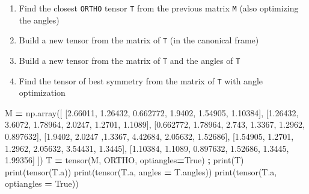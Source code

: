 \documentclass[
  a4paper,
  numbers=noendperiod,
  DIV=12]{scrreprt}
\newenvironment{Shaded}{\begin{snugshade}}{\end{snugshade}}
\newcommand{\BuiltInTok}[1]{#1}
\newcommand{\FloatTok}[1]{\textcolor[rgb]{0.00,0.00,0.81}{#1}}
\newcommand{\NormalTok}[1]{#1}
\newcommand{\OperatorTok}[1]{\textcolor[rgb]{0.81,0.36,0.00}{\textbf{#1}}}
\newcommand{\VariableTok}[1]{\textcolor[rgb]{0.00,0.00,0.00}{#1}}
\begin{document}
\begin{tcolorbox}[enhanced jigsaw, arc=.35mm, bottomrule=.15mm, bottomtitle=1mm, breakable, colback=white, colbacktitle=quarto-callout-caution-color!10!white, colframe=quarto-callout-caution-color-frame, coltitle=black, left=2mm, leftrule=.75mm, opacityback=0, opacitybacktitle=0.6, rightrule=.15mm, title={Exercise}, titlerule=0mm, toprule=.15mm, toptitle=1mm]

\begin{enumerate}
\def\labelenumi{\arabic{enumi}.}
\item
  Find the closest \texttt{ORTHO} tensor \texttt{T} from the previous
  matrix \texttt{M} (also optimizing the angles)
\item
  Build a new tensor from the matrix of \texttt{T} (in the canonical
  frame)
\item
  Build a new tensor from the matrix of \texttt{T} and the angles of
  \texttt{T}
\item
  Find the tensor of best symmetry from the matrix of \texttt{T} with
  angle optimization
\end{enumerate}

\begin{Shaded}
\begin{Highlighting}[]
\NormalTok{M }\OperatorTok{=}\NormalTok{ np.array([ [}\FloatTok{2.66011}\NormalTok{, }\FloatTok{1.26432}\NormalTok{, }\FloatTok{0.662772}\NormalTok{, }\FloatTok{1.9402}\NormalTok{, }\FloatTok{1.54905}\NormalTok{, }\FloatTok{1.10384}\NormalTok{],}
\NormalTok{               [}\FloatTok{1.26432}\NormalTok{, }\FloatTok{3.6072}\NormalTok{, }\FloatTok{1.78964}\NormalTok{, }\FloatTok{2.0247}\NormalTok{, }\FloatTok{1.2701}\NormalTok{, }\FloatTok{1.1089}\NormalTok{], }
\NormalTok{               [}\FloatTok{0.662772}\NormalTok{, }\FloatTok{1.78964}\NormalTok{, }\FloatTok{2.743}\NormalTok{, }\FloatTok{1.3367}\NormalTok{, }\FloatTok{1.2962}\NormalTok{, }\FloatTok{0.897632}\NormalTok{], }
\NormalTok{               [}\FloatTok{1.9402}\NormalTok{, }\FloatTok{2.0247}\NormalTok{ ,}\FloatTok{1.3367}\NormalTok{, }\FloatTok{4.42684}\NormalTok{, }\FloatTok{2.05632}\NormalTok{, }\FloatTok{1.52686}\NormalTok{], }
\NormalTok{               [}\FloatTok{1.54905}\NormalTok{, }\FloatTok{1.2701}\NormalTok{, }\FloatTok{1.2962}\NormalTok{, }\FloatTok{2.05632}\NormalTok{, }\FloatTok{3.54431}\NormalTok{, }\FloatTok{1.3445}\NormalTok{], }
\NormalTok{               [}\FloatTok{1.10384}\NormalTok{, }\FloatTok{1.1089}\NormalTok{, }\FloatTok{0.897632}\NormalTok{, }\FloatTok{1.52686}\NormalTok{, }\FloatTok{1.3445}\NormalTok{, }\FloatTok{1.99356}\NormalTok{] ])}
\NormalTok{T }\OperatorTok{=}\NormalTok{ tensor(M, ORTHO, optiangles}\OperatorTok{=}\VariableTok{True}\NormalTok{) }\OperatorTok{;} \BuiltInTok{print}\NormalTok{(T)}
\BuiltInTok{print}\NormalTok{(tensor(T.a))}
\BuiltInTok{print}\NormalTok{(tensor(T.a, angles }\OperatorTok{=}\NormalTok{ T.angles))}
\BuiltInTok{print}\NormalTok{(tensor(T.a, optiangles }\OperatorTok{=} \VariableTok{True}\NormalTok{))}
\end{Highlighting}
\end{Shaded}


\end{tcolorbox}
\end{document}
